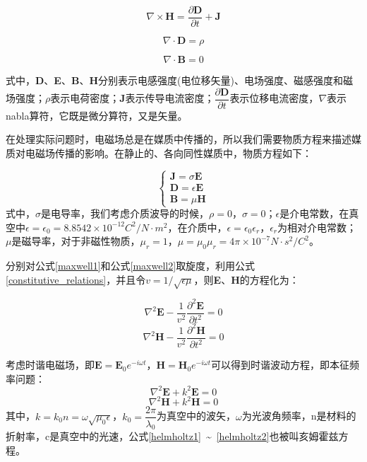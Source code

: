 \begin{equation}
\label{maxwell2}
\nabla \times \textbf{H} = \dfrac{\partial\textbf{D}}{\partial t}+\textbf{J}
\end{equation}

\begin{equation}
\label{maxwell3}
\nabla \cdot \textbf{D} = \rho
\end{equation}

\begin{equation}
\label{maxwell4}
\nabla \cdot \textbf{B} = 0
\end{equation}

式中，\textbf{D}、\textbf{E}、\textbf{B}、\textbf{H}分别表示电感强度(电位移矢量)、电场强度、磁感强度和磁场强度；$\rho$表示电荷密度；\textbf{J}表示传导电流密度；$\dfrac{\partial\textbf{D}}{\partial t}$表示位移电流密度，$\nabla$表示nabla算符，它既是微分算符，又是矢量。

在处理实际问题时，电磁场总是在媒质中传播的，所以我们需要物质方程来描述媒质对电磁场传播的影响。在静止的、各向同性媒质中，物质方程如下：

\begin{equation}
\label{constitutive_relations}
\left\{
\begin{array}{c}
\textbf{J}=\sigma\textbf{E}\\
\textbf{D}=\epsilon\textbf{E}\\
\textbf{B}=\mu\textbf{H}
\end{array}
\right.
\end{equation}
式中，$\sigma$是电导率，我们考虑介质波导的时候，$\rho=0$，$\sigma=0$；$\epsilon$是介电常数，在真空中$\epsilon=\epsilon_{0}=8.8542\times10^{-12}C^{2}/N\cdot m^{2}$，在介质中，$\epsilon=\epsilon_{0}\epsilon_{r}$，$\epsilon_{r}$为相对介电常数；$\mu$是磁导率，对于非磁性物质，$\mu_{r}=1$，$\mu=\mu_{0}\mu_{r}=4\pi\times10^{-7}N\cdot s^{2}/C^{2}$。

分别对公式\ref{maxwell1}和公式\ref{maxwell2}取旋度，利用公式\ref{constitutive_relations}，并且令$v=1/\sqrt{\epsilon\mu}$，则\textbf{E}、\textbf{H}的方程化为：

\begin{equation}
\nabla^{2}\textbf{E}-\dfrac{1}{v^{2}}\dfrac{\partial^{2}\textbf{E}}{\partial t^{2}}=0
\end{equation}
\begin{equation}
\nabla^{2}\textbf{H}-\dfrac{1}{v^{2}}\dfrac{\partial^{2}\textbf{H}}{\partial t^{2}}=0
\end{equation}

考虑时谐电磁场，即$\textbf{E}=\textbf{E}_{0}e^{-i\omega t}$，$\textbf{H}=\textbf{H}_{0}e^{-i\omega t}$可以得到时谐波动方程，即本征频率问题：
\begin{equation}
\label{helmholtz1}
\nabla^{2}\textbf{E}+k^{2}\textbf{E}=0
\end{equation}
\begin{equation}
\label{helmholtz2}
\nabla^{2}\textbf{H}+k^{2}\textbf{H}=0
\end{equation}
其中，$k=k_{0}n=\omega \sqrt{\mu_{0}\epsilon}$，$k_{0}=\dfrac{2\pi}{\lambda_{0}}$为真空中的波矢，$\omega$为光波角频率，n是材料的折射率，c是真空中的光速，公式\ref{helmholtz1}~\~{}~\ref{helmholtz2}也被叫亥姆霍兹方程。

